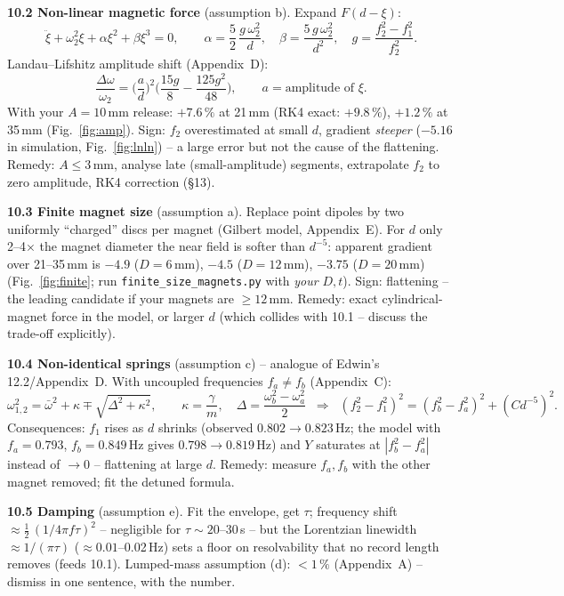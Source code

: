 \documentclass[11pt,a4paper]{article}
\newcommand{\Y}{Y}                                   %
\begin{document}
\textbf{10.2 Non-linear magnetic force} (assumption b). Expand $F(d-\xi)$:
\begin{equation}
  \ddot\xi+\omega_2^2\xi+\alpha\xi^2+\beta\xi^3=0,\qquad
  \alpha=\frac{5}{2}\,\frac{g\,\omega_2^2}{d},\quad \beta=\frac{5\,g\,\omega_2^2}{d^2},\quad
  g=\frac{f_2^2-f_1^2}{f_2^2}.
\end{equation}
Landau--Lifshitz amplitude shift (Appendix~D):
\begin{equation}
  \frac{\Delta\omega}{\omega_2}=\Big(\frac{a}{d}\Big)^2\Big(\frac{15g}{8}-\frac{125g^2}{48}\Big),
  \qquad a=\text{amplitude of }\xi .
\end{equation}
With your $A=10$\,mm release: $+7.6\,\%$ at 21\,mm (RK4 exact: $+9.8\,\%$), $+1.2\,\%$ at
35\,mm (Fig.~\ref{fig:amp}). Sign: $f_2$ overestimated at small $d$, gradient
\emph{steeper} ($-5.16$ in simulation, Fig.~\ref{fig:lnln}) -- a large error but not the
cause of the flattening. Remedy: $A\le3$\,mm, analyse late (small-amplitude) segments,
extrapolate $f_2$ to zero amplitude, RK4 correction (\S13).

\textbf{10.3 Finite magnet size} (assumption a). Replace point dipoles by two uniformly
``charged'' discs per magnet (Gilbert model, Appendix~E). For $d$ only 2--4$\times$ the
magnet diameter the near field is softer than $d^{-5}$: apparent gradient over 21--35\,mm
is $-4.9$ ($D=6$\,mm), $-4.5$ ($D=12$\,mm), $-3.75$ ($D=20$\,mm) (Fig.~\ref{fig:finite};
run \texttt{finite\_size\_magnets.py} with \emph{your} $D,t$). Sign: flattening -- the
leading candidate if your magnets are $\ge12$\,mm. Remedy: exact cylindrical-magnet force
in the model, or larger $d$ (which collides with 10.1 -- discuss the trade-off explicitly).

\textbf{10.4 Non-identical springs} (assumption c) -- analogue of Edwin's 12.2/Appendix~D.
With uncoupled frequencies $f_a\neq f_b$ (Appendix~C):
\begin{equation}
  \omega_{1,2}^2=\bar\omega^2+\kappa\mp\sqrt{\Delta^2+\kappa^2},\qquad
  \kappa=\frac{\gamma}{m},\quad \Delta=\frac{\omega_b^2-\omega_a^2}{2}
  \;\;\Longrightarrow\;\;
  (f_2^2-f_1^2)^2=(f_b^2-f_a^2)^2+(C d^{-5})^2 .
\end{equation}
Consequences: $f_1$ rises as $d$ shrinks (observed $0.802\to0.823$\,Hz; the model with
$f_a=0.793$, $f_b=0.849$\,Hz gives $0.798\to0.819$\,Hz) and $\Y$ saturates at
$|f_b^2-f_a^2|$ instead of $\to0$ -- flattening at large $d$. Remedy: measure $f_a,f_b$
with the other magnet removed; fit the detuned formula.

\textbf{10.5 Damping} (assumption e). Fit the envelope, get $\tau$; frequency shift
$\approx\tfrac12\,(1/4\pi f\tau)^2$ -- negligible for $\tau\sim20$--30\,s -- but the
Lorentzian linewidth $\approx1/(\pi\tau)$ ($\approx0.01$--0.02\,Hz) sets a floor on
resolvability that no record length removes (feeds 10.1). Lumped-mass assumption (d):
$<1\,\%$ (Appendix~A) -- dismiss in one sentence, with the number.
\end{document}
